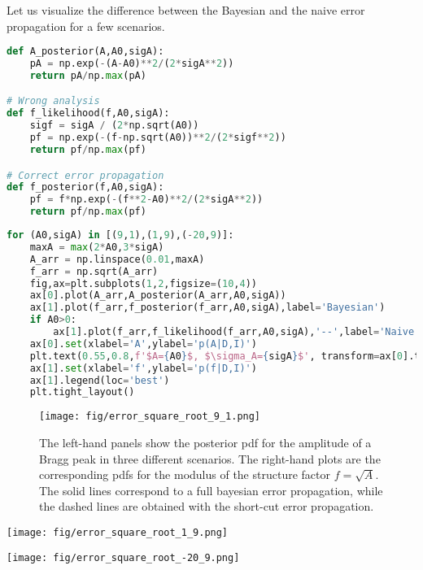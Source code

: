 \documentclass[%
oneside,                 %
final,                   %
10pt]{article}
\begin{document}
Let us visualize the difference between the Bayesian and the naive error propagation for a few scenarios.

\begin{lstlisting}[language=Python,style=blue1]
def A_posterior(A,A0,sigA):
    pA = np.exp(-(A-A0)**2/(2*sigA**2))
    return pA/np.max(pA)

# Wrong analysis
def f_likelihood(f,A0,sigA):
    sigf = sigA / (2*np.sqrt(A0))
    pf = np.exp(-(f-np.sqrt(A0))**2/(2*sigf**2))
    return pf/np.max(pf)

# Correct error propagation
def f_posterior(f,A0,sigA):
    pf = f*np.exp(-(f**2-A0)**2/(2*sigA**2))
    return pf/np.max(pf)
\end{lstlisting}

\begin{lstlisting}[language=Python,style=blue1]
for (A0,sigA) in [(9,1),(1,9),(-20,9)]:
    maxA = max(2*A0,3*sigA)
    A_arr = np.linspace(0.01,maxA)
    f_arr = np.sqrt(A_arr)
    fig,ax=plt.subplots(1,2,figsize=(10,4))
    ax[0].plot(A_arr,A_posterior(A_arr,A0,sigA))
    ax[1].plot(f_arr,f_posterior(f_arr,A0,sigA),label='Bayesian')
    if A0>0:
        ax[1].plot(f_arr,f_likelihood(f_arr,A0,sigA),'--',label='Naive')
    ax[0].set(xlabel='A',ylabel='p(A|D,I)')
    plt.text(0.55,0.8,f'$A={A0}$, $\sigma_A={sigA}$', transform=ax[0].transAxes,fontsize=16)
    ax[1].set(xlabel='f',ylabel='p(f|D,I)')
    ax[1].legend(loc='best')
    plt.tight_layout()
\end{lstlisting}


\begin{figure}[!ht]  %
  \centerline{\texttt{[image: fig/error\_square\_root\_9\_1.png]}}
  \caption{
  The left-hand panels show the posterior pdf for the amplitude of a Bragg peak in three different scenarios. The right-hand plots are the corresponding pdfs for the modulus of the structure factor $f=\sqrt{A}$. The solid lines correspond to a full bayesian error propagation, while the dashed lines are obtained with the short-cut error propagation.
  }
\end{figure}




\vspace{6mm}

\centerline{\texttt{[image: fig/error\_square\_root\_1\_9.png]}}

\vspace{6mm}





\vspace{6mm}

\centerline{\texttt{[image: fig/error\_square\_root\_-20\_9.png]}}

\vspace{6mm}




\end{document}
